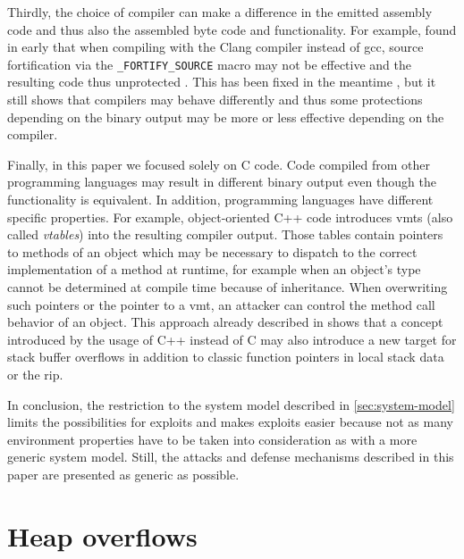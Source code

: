 Thirdly, the choice of compiler can make a difference in the emitted assembly code and thus also the assembled byte code and functionality.
For example, \citeauthor{Guelton2020} found in early \citeyear{Guelton2020} that when compiling with the Clang compiler instead of \gls{gcc}, source fortification via the \texttt{\_FORTIFY\_SOURCE} macro may not be effective and the resulting code thus unprotected \cite{Guelton2020}.
This has been fixed in the meantime \cite{Guelton2020a}, but it still shows that compilers may behave differently and thus some protections depending on the binary output may be more or less effective depending on the compiler.

Finally, in this paper we focused solely on C code.
Code compiled from other programming languages may result in different binary output even though the functionality is equivalent.
In addition, programming languages have different specific properties.
For example, object-oriented C++ code introduces \glspl{vmt} (also called \emph{vtables}) into the resulting compiler output.
Those tables contain pointers to methods of an object which may be necessary to dispatch to the correct implementation of a method at runtime, for example when an object's type cannot be determined at compile time because of inheritance.
When overwriting such pointers or the pointer to a \gls{vmt}, an attacker can control the method call behavior of an object.
This approach already described in \citeyear{rix2000} \cite{rix2000} shows that a concept introduced by the usage of C++ instead of C may also introduce a new target for stack buffer overflows in addition to classic function pointers in local stack data or the \acrfull{rip}.

In conclusion, the restriction to the system model described in \cref{sec:system-model} limits the possibilities for exploits and makes exploits easier because not as many environment properties have to be taken into consideration as with a more generic system model.
Still, the attacks and defense mechanisms described in this paper are presented as generic as possible.

\section{Heap overflows}
\label{sec:heap-overflows}

